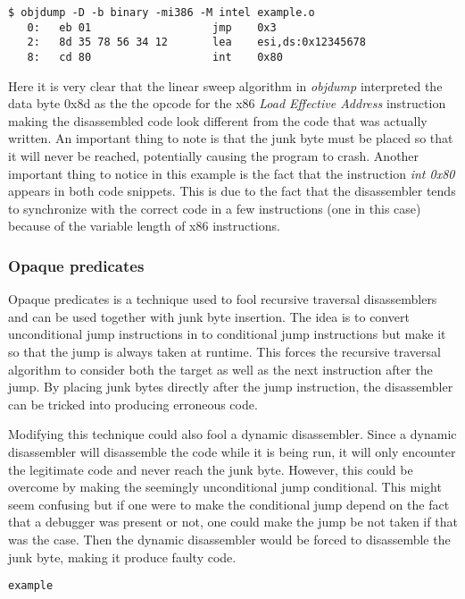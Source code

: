 \documentclass[11pt,twoside]{eitExjobb}
\begin{document}
\begin{verbatim}
$ objdump -D -b binary -mi386 -M intel example.o
   0:	eb 01                	jmp    0x3
   2:	8d 35 78 56 34 12    	lea    esi,ds:0x12345678
   8:	cd 80                	int    0x80
\end{verbatim}

\noindent Here it is very clear that the linear sweep algorithm in \emph{objdump} interpreted the data byte 0x8d as the the opcode for the x86 \emph{Load Effective Address} instruction making the disassembled code look different from the code that was actually written. An important thing to note is that the junk byte must be placed so that it will never be reached, potentially causing the program to crash. Another important thing to notice in this example is the fact that the instruction \emph{int 0x80} appears in both code snippets. This is due to the fact that the disassembler tends to synchronize with the correct code in a few instructions (one in this case) because of the variable length of x86 instructions.  

\subsubsection{Opaque predicates}
Opaque predicates is a technique used to fool recursive traversal disassemblers and can be used together with junk byte insertion. The idea is to convert unconditional jump instructions in to conditional jump instructions but make it so that the jump is always taken at runtime. This forces the recursive traversal algorithm to consider both the target as well as the next instruction after the jump. By placing junk bytes directly after the jump instruction, the disassembler can be tricked into producing erroneous code.\cite{instructionoverlapping}

Modifying this technique could also fool a dynamic disassembler. Since a dynamic disassembler will disassemble the code while it is being run, it will only encounter the legitimate code and never reach the junk byte. However, this could be overcome by making the seemingly unconditional jump conditional. This might seem confusing but if one were to make the conditional jump depend on the fact that a debugger was present or not, one could make the jump be not taken if that was the case. Then the dynamic disassembler would be forced to disassemble the junk byte, making it produce faulty code.

\begin{verbatim}
example
\end{verbatim}
\end{document}

